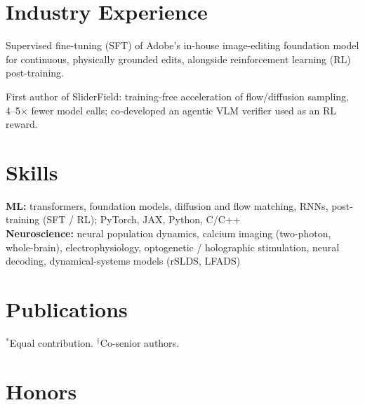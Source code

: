 \documentclass[resume]{clean_cv}
\begin{document}
\section{Industry Experience}
\begin{bullets}
\item Supervised fine-tuning (SFT) of Adobe's in-house image-editing foundation model for continuous, physically grounded edits, alongside reinforcement learning (RL) post-training.
\item First author of SliderField: training-free acceleration of flow/diffusion sampling, 4--5$\times$ fewer model calls; co-developed an agentic VLM verifier used as an RL reward.
\end{bullets}

\section{Skills}
\textbf{ML:} transformers, foundation models, diffusion and flow matching, RNNs, post-training (SFT / RL); PyTorch, JAX, Python, C/C++ \\
\textbf{Neuroscience:} neural population dynamics, calcium imaging (two-photon, whole-brain), electrophysiology, optogenetic / holographic stimulation, neural decoding, dynamical-systems models (rSLDS, LFADS)

\section{Publications}
\begin{publist}
\pubPOCO
\pubCosyneCausal
\pubCosyneDist
\pubHebbian
\pubNMRNN
\pubWM
\pubSlider
\pubVerify
\end{publist}
{\small $^*$Equal contribution. $^\dagger$Co-senior authors.}

\section{Honors}
\honorsresume
\end{document}
